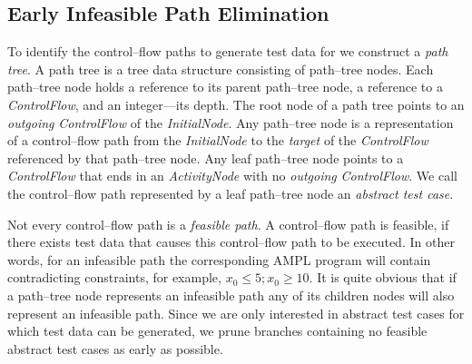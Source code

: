 \documentclass[runningheads,a4paper]{llncs}%
\newcommand{\UMLType}[1]{\textsf{\textit{#1}}} %
\newcommand{\UMLReference}[1]{\textsf{\textit{#1}}} %
\begin{document}
\subsection{Early Infeasible Path Elimination}%
\label{sec:InfeasiblePathElimination}%
To identify the control--flow paths to generate test data for we construct a \emph{path tree}. A path tree is a tree data structure consisting of path--tree nodes. Each path--tree node holds a reference to its parent path--tree node, a reference to a \UMLType{ControlFlow}, and an integer---its depth. The root node of a path tree points to an \UMLReference{outgoing} \UMLType{ControlFlow} of the \UMLType{InitialNode}. Any path--tree node is a representation of a control--flow path from the \UMLType{InitialNode} to the \UMLReference{target} of the \UMLType{ControlFlow} referenced by that path--tree node. Any leaf path--tree node points to a \UMLType{ControlFlow} that ends in an \UMLType{ActivityNode} with no \UMLReference{outgoing} \UMLType{ControlFlow}. We call the control--flow path represented by a leaf path--tree node an \emph{abstract test case}.

Not every control--flow path is a \emph{feasible path}. A control--flow path is feasible, if there exists test data that causes this control--flow path to be executed. In other words, for an infeasible path the corresponding AMPL program will contain contradicting constraints, for example, $x_0\leq5; x_0\geq10$. It is quite obvious that if a path--tree node represents an infeasible path any of its children nodes will also represent an infeasible path. Since we are only interested in abstract test cases for which test data can be generated, we prune branches containing no feasible abstract test cases as early as possible.
\end{document}
